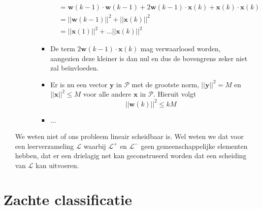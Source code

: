 \begin{itemize}
\begin{itemize}
\begin{itemize}
\begin{itemize}
\begin{align*}
                                        & = \textbf{w}(k - 1)\cdot \textbf{w}(k - 1) + 2\textbf{w}(k - 1)\cdot\textbf{x}(k) + \textbf{x}(k)\cdot \textbf{x}(k) \\
                                        & = ||\textbf{w}(k - 1)||^2 + ||\textbf{x}(k)||^2 \\
                                        & = ||\textbf{x}(1)||^2 + ... ||\textbf{x}(k)||^2
                \end{align*}
                \item De term $2\textbf{w}(k - 1)\cdot\textbf{x}(k)$ mag verwaarloosd worden, aangezien deze kleiner is dan nul en dus de bovengrens zeker niet zal beïnvloeden.
                \item Er is nu een vector $\textbf{y}$ in $\mathcal{P}$ met de grootste norm, $||\textbf{y}||^2 = M$ en $||\textbf{x}||^2 \leq M$ voor alle andere $\textbf{x}$ in $\mathcal{P}$. Hieruit volgt
                $$||\textbf{w}(k)||^2 \leq kM$$
                \item ...
            \end{itemize}
        \end{itemize}
        
    \end{itemize}
    \alert We weten niet of ons probleem lineair scheidbaar is.
    \good Wel weten we dat voor een leerverzameling $\mathcal{L}$ waarbij $\mathcal{L}^+$ en $\mathcal{L}^-$ geen gemeenschappelijke elementen hebben, dat er een drielagig net kan geconstrueerd worden dat een scheiding van $\mathcal{L}$ kan uitvoeren.
\end{itemize}


\section{Zachte classificatie}


